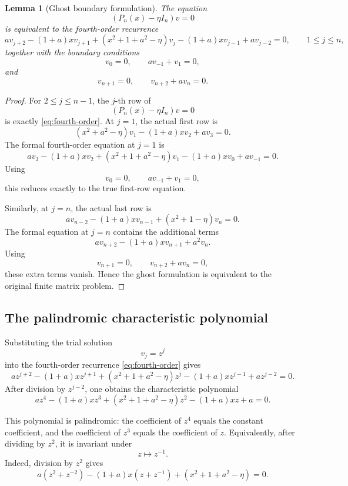 \documentclass[11pt]{amsart}
\numberwithin{equation}{section}
\newtheorem{lemma}[theorem]{Lemma}
\begin{document}
\begin{lemma}[Ghost boundary formulation]
The equation
\[
        (P_n(x)-\eta I_n)v=0
\]
is equivalent to the fourth-order recurrence
\[
        a v_{j+2}
        -(1+a)xv_{j+1}
        +(x^2+1+a^2-\eta)v_j
        -(1+a)xv_{j-1}
        +a v_{j-2}
        =
        0,
        \qquad 1\le j\le n,
\]
together with the boundary conditions
\[
        v_0=0,\qquad av_{-1}+v_1=0,
\]
and
\[
        v_{n+1}=0,\qquad v_{n+2}+av_n=0.
\]
\end{lemma}

\begin{proof}
For \(2\le j\le n-1\), the \(j\)-th row of
\[
        (P_n(x)-\eta I_n)v=0
\]
is exactly \eqref{eq:fourth-order}.  At \(j=1\), the actual first row is
\[
        (x^2+a^2-\eta)v_1-(1+a)xv_2+av_3=0.
\]
The formal fourth-order equation at \(j=1\) is
\[
        av_3-(1+a)xv_2+(x^2+1+a^2-\eta)v_1-(1+a)xv_0+av_{-1}=0.
\]
Using
\[
        v_0=0,
        \qquad
        av_{-1}+v_1=0,
\]
this reduces exactly to the true first-row equation.

Similarly, at \(j=n\), the actual last row is
\[
        av_{n-2}-(1+a)xv_{n-1}+(x^2+1-\eta)v_n=0.
\]
The formal equation at \(j=n\) contains the additional terms
\[
        a v_{n+2}-(1+a)xv_{n+1}+a^2v_n.
\]
Using
\[
        v_{n+1}=0,
        \qquad
        v_{n+2}+av_n=0,
\]
these extra terms vanish.  Hence the ghost formulation is equivalent to the
original finite matrix problem.
\end{proof}

\subsection{The palindromic characteristic polynomial}

Substituting the trial solution
\[
        v_j=z^j
\]
into the fourth-order recurrence \eqref{eq:fourth-order} gives
\[
        a z^{j+2}
        -(1+a)xz^{j+1}
        +(x^2+1+a^2-\eta)z^j
        -(1+a)xz^{j-1}
        +az^{j-2}
        =
        0.
\]
After division by \(z^{j-2}\), one obtains the characteristic polynomial
\begin{equation}\label{eq:palindromic-quartic}
        a z^4
        -(1+a)xz^3
        +(x^2+1+a^2-\eta)z^2
        -(1+a)xz
        +a
        =
        0 .
\end{equation}

This polynomial is palindromic: the coefficient of \(z^4\) equals the
constant coefficient, and the coefficient of \(z^3\) equals the coefficient
of \(z\).  Equivalently, after dividing by \(z^2\), it is invariant under
\[
        z\longmapsto z^{-1}.
\]
Indeed, division by \(z^2\) gives
\[
        a(z^2+z^{-2})
        -(1+a)x(z+z^{-1})
        +(x^2+1+a^2-\eta)
        =
        0.
\]
\end{document}
